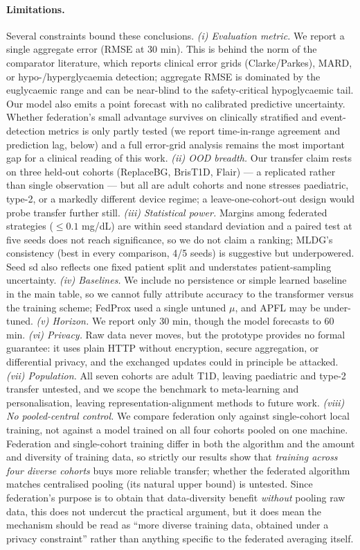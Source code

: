 \documentclass[10pt,letterpaper]{article}
\begin{document}
\paragraph{Limitations.} Several constraints bound these conclusions. \emph{(i)
Evaluation metric.} We report a single aggregate error (RMSE at 30 min). This is
behind the norm of the comparator literature, which reports clinical error grids
(Clarke/Parkes), MARD, or hypo-/hyperglycaemia detection; aggregate RMSE is
dominated by the euglycaemic range and can be near-blind to the safety-critical
hypoglycaemic tail. Our model also emits a point forecast with no calibrated
predictive uncertainty. Whether federation's small advantage survives on
clinically stratified and event-detection metrics is only partly tested (we
report time-in-range agreement and prediction lag, below) and a full error-grid
analysis remains the most important gap for a clinical reading of this work.
\emph{(ii) OOD breadth.} Our transfer claim rests on three held-out cohorts
(ReplaceBG, BrisT1D, Flair) --- a replicated rather than single observation ---
but all are adult cohorts and none stresses paediatric, type-2, or a markedly
different device regime; a leave-one-cohort-out design would probe transfer
further still. \emph{(iii) Statistical power.} Margins among federated strategies
($\le 0.1$ mg/dL) are within seed standard deviation and a paired test at five
seeds does not reach significance, so we do not claim a ranking; MLDG's
consistency (best in every comparison, 4/5 seeds) is suggestive but underpowered.
Seed sd also reflects one fixed patient split and understates patient-sampling
uncertainty. \emph{(iv) Baselines.} We include no persistence or
simple learned baseline in the main table, so we cannot fully attribute accuracy
to the transformer versus the training scheme; FedProx used a single untuned
$\mu$, and APFL may be under-tuned. \emph{(v) Horizon.} We report only 30 min,
though the model forecasts to 60 min. \emph{(vi) Privacy.} Raw data never moves,
but the prototype provides no formal guarantee: it uses plain HTTP without
encryption, secure aggregation, or differential privacy, and the exchanged
updates could in principle be attacked. \emph{(vii) Population.} All seven cohorts
are adult T1D, leaving paediatric and type-2 transfer untested, and we scope the
benchmark to meta-learning and personalisation, leaving representation-alignment
methods to future work. \emph{(viii) No pooled-central control.} We compare
federation only against single-cohort local training, not against a model trained
on all four cohorts pooled on one machine. Federation and single-cohort training
differ in both the algorithm and the amount and diversity of training data, so
strictly our results show that \emph{training across four diverse cohorts} buys
more reliable transfer; whether the federated algorithm matches centralised
pooling (its natural upper bound) is untested. Since federation's purpose is to
obtain that data-diversity benefit \emph{without} pooling raw data, this does not
undercut the practical argument, but it does mean the mechanism should be read as
``more diverse training data, obtained under a privacy constraint'' rather than
anything specific to the federated averaging itself.
\end{document}
